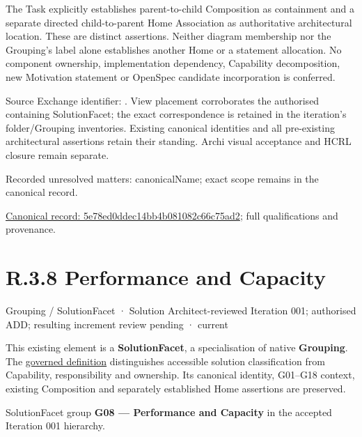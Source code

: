 The Task explicitly establishes parent-to-child Composition as containment and
a separate directed child-to-parent Home Association as authoritative architectural
location. These are distinct assertions. Neither diagram membership nor the
Grouping's label alone establishes another Home or a statement allocation.
No component ownership, implementation dependency, Capability decomposition,
new Motivation statement or OpenSpec candidate incorporation is conferred.



Source Exchange identifier: \texttt{}. View placement corroborates
the authorised containing SolutionFacet; the exact correspondence is retained in the
iteration's folder/Grouping inventories. Existing canonical identities and all
pre-existing architectural assertions retain their standing. Archi visual
acceptance and HCRL closure remain separate.


{\small Recorded unresolved matters: canonicalName; exact scope remains in the canonical record.}\par
{\footnotesize \href{../../../../../../../continuum/grouping/5e78ed0ddec14bb4b081082c66c75ad2.md}{Canonical record: 5e78ed0ddec14bb4b081082c66c75ad2}; full qualifications and provenance.}\par
\section*{R.3.8 Performance and Capacity}
\label{navigation:R.3.8}

\label{element:8034148e63e6457f90e8cae1d4eb4453}
{\small Grouping / SolutionFacet · Solution Architect-reviewed Iteration 001; authorised ADD; resulting increment review pending · current}\par

This existing element is a \textbf{SolutionFacet}, a specialisation of native
\textbf{Grouping}. The \href{\detokenize{../../../../../../../governance/continuum-representation.md#solutionfacet-classification--1119-candidate}}{governed definition}
distinguishes accessible solution classification from Capability, responsibility
and ownership. Its canonical identity, G01–G18 context, existing Composition
and separately established Home assertions are preserved.



SolutionFacet group \textbf{G08 — Performance and Capacity} in the accepted Iteration 001 hierarchy.



